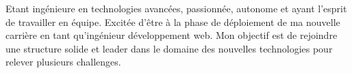 \documentclass[10pt,a4paper,ragged2e,withhyper]{altacv}
\begin{document}
\begin{paracol}{2}



\switchcolumn

Etant ingénieure en technologies avancées, passionnée, autonome et ayant l'esprit de travailler en équipe. Excitée d'être à la phase de déploiement de ma nouvelle carrière en tant qu'ingénieur développement web. Mon objectif est de rejoindre une structure solide et leader dans le domaine des nouvelles technologies pour relever plusieurs challenges.

         

\end{paracol}
\end{document}
